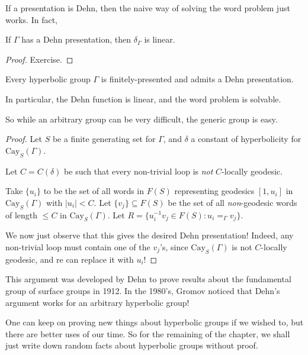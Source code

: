 \documentclass[a4paper]{article}
\newcommand\Cay{\mathrm{Cay}}
\begin{document}
If a presentation is Dehn, then the naive way of solving the word problem just works. In fact,

\begin{lemma}
  If $\Gamma$ has a Dehn presentation, then $\delta_\Gamma$ is linear.
\end{lemma}

\begin{proof}
  Exercise.
\end{proof}

\begin{thm}
  Every hyperbolic group $\Gamma$ is finitely-presented and admits a Dehn presentation.

  In particular, the Dehn function is linear, and the word problem is solvable.
\end{thm}
So while an arbitrary group can be very difficult, the generic group is easy.

\begin{proof}
  Let $S$ be a finite generating set for $\Gamma$, and $\delta$ a constant of hyperbolicity for $\Cay_S(\Gamma)$.

  Let $C = C(\delta)$ be such that every non-trivial loop is \emph{not} $C$-locally geodesic.

  Take $\{u_i\}$ to be the set of all words in $F(S)$ representing geodesics $[1, u_i]$ in $\Cay_S(\Gamma)$ with $|u_i| < C$. Let $\{v_j\} \subseteq F(S)$ be the set of all \emph{non}-geodesic words of length $\leq C$ in $\Cay_S(\Gamma)$. Let $R = \{u_i^{-1} v_j \in F(S) : u_i =_\Gamma v_j\}$.

  We now just observe that this gives the desired Dehn presentation! Indeed, any non-trivial loop must contain one of the $v_j$'s, since $\Cay_S(\Gamma)$ is not $C$-locally geodesic, and re can replace it with $u_i$!
\end{proof}
This argument was developed by Dehn to prove results about the fundamental group of surface groups in 1912. In the 1980's, Gromov noticed that Dehn's argument works for an arbitrary hyperbolic group!

One can keep on proving new things about hyperbolic groups if we wished to, but there are better uses of our time. So for the remaining of the chapter, we shall just write down random facts about hyperbolic groups without proof.
\end{document}
